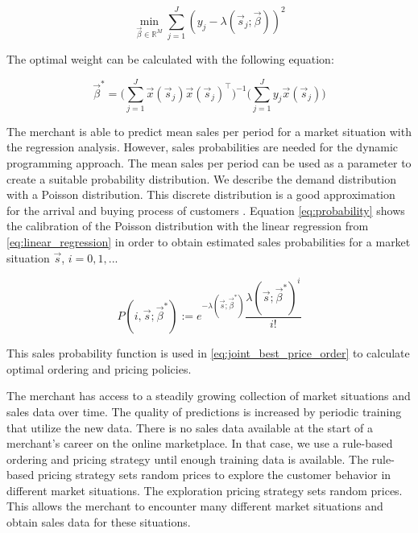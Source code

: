 \begin{equation}
 \min_{\vec{\beta} \in \mathbb{R}^M}{\sum_{j=1}^J
	{(y_j - \lambda(\vec{s}_j; \vec{\beta}))^2}
}
\label{eq:least_squares_objective}
\end{equation}

The optimal weight can be calculated with the following equation:

\begin{equation}
\vec{\beta}^* = \bigg(\sum_{j=1}^J{\vec{x}(\vec{s}_j) \vec{x}(\vec{s}_j)^\intercal} \bigg)^{-1}
			  \bigg(\sum_{j=1}^J{y_j \vec{x}(\vec{s}_j)} \bigg)
\end{equation}

The merchant is able to predict mean sales per period for a market situation with the regression analysis.
However, sales probabilities are needed for the dynamic programming approach.
The mean sales per period can be used as a parameter to create a suitable probability distribution.
We describe the demand distribution with a Poisson distribution.
This discrete distribution is a good approximation for the arrival and buying process of customers \cite{DBLP:journals/ior/Wolff82}.
Equation \cref{eq:probability} shows the calibration of the Poisson distribution with the linear regression from \cref{eq:linear_regression} in order to obtain estimated sales probabilities for a market situation $\vec{s}$, $i = 0,1,...$

\begin{equation}
\label{eq:probability}
P(i, \vec{s}; \vec{\beta}^*) :=
	e^{-\lambda(\vec{s}; \vec{\beta}^*)}
	\frac{\lambda(\vec{s}; \vec{\beta}^*)^{i}}{i!}
\end{equation}

This sales probability function is used in \cref{eq:joint_best_price_order} to calculate optimal ordering and pricing policies.

The merchant has access to a steadily growing collection of market situations and sales data over time.
The quality of predictions is increased by periodic training that utilize the new data.
There is no sales data available at the start of a merchant's career on the online marketplace.
In that case, we use a rule-based ordering and pricing strategy until enough training data is available.
The rule-based pricing strategy sets random prices to explore the customer behavior in different market situations.
The exploration pricing strategy sets random prices.
This allows the merchant to encounter many different market situations and obtain sales data for these situations.

